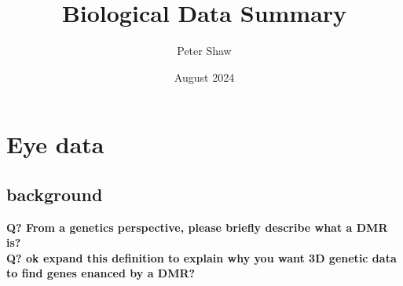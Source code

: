 \documentclass{article}
\title{Biological Data Summary}
\author{Peter Shaw}
\date{August 2024}
\begin{document}
\lstset{
    language=Python,
    basicstyle=\small\ttfamily,
    numbers=left,
    numbersep=5pt,
    frame=single,
    captionpos=b,
    breaklines=true,
    breakatwhitespace=false
}

\maketitle

\section{Eye data}
\subsection{background}

\textbf{
Q? From a genetics perspective, please briefly describe what a DMR is?\\
}
\textbf{
Q? ok expand this definition to explain why you want 3D genetic data to find genes enanced by a DMR?\\
}
\end{document}
